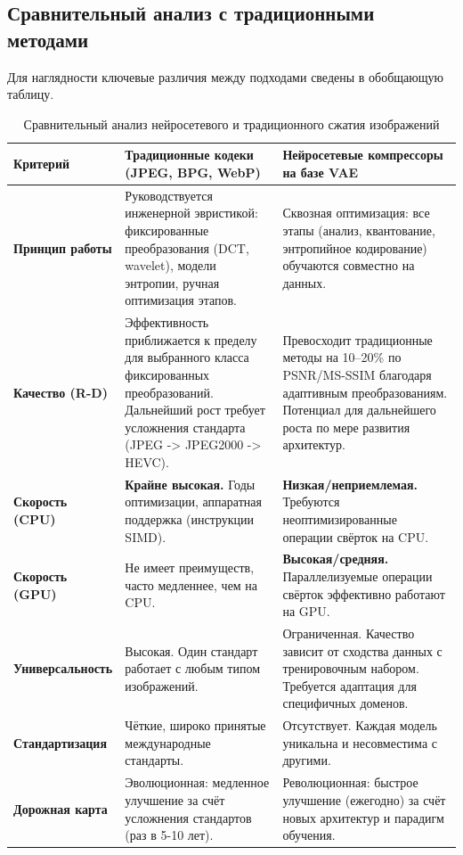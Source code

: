 \subsection{Сравнительный анализ с традиционными методами}
Для наглядности ключевые различия между подходами сведены в обобщающую таблицу.

\begin{table}[h]
\centering
\small
\caption{Сравнительный анализ нейросетевого и традиционного сжатия изображений}
\label{tab:final_comparison}
\begin{tabular}{|l|p{6cm}|p{6cm}|}
\hline
\textbf{Критерий} & \textbf{Традиционные кодеки (JPEG, BPG, WebP)} & \textbf{Нейросетевые компрессоры на базе VAE} \\
\hline
\textbf{Принцип работы} & Руководствуется инженерной эвристикой: фиксированные преобразования (DCT, wavelet), модели энтропии, ручная оптимизация этапов. & Сквозная оптимизация: все этапы (анализ, квантование, энтропийное кодирование) обучаются совместно на данных. \\
\hline
\textbf{Качество (R-D)} & Эффективность приближается к пределу для выбранного класса фиксированных преобразований. Дальнейший рост требует усложнения стандарта (JPEG -> JPEG2000 -> HEVC). & Превосходит традиционные методы на 10–20\% по PSNR/MS-SSIM благодаря адаптивным преобразованиям. Потенциал для дальнейшего роста по мере развития архитектур. \\
\hline
\textbf{Скорость (CPU)} & \textbf{Крайне высокая.} Годы оптимизации, аппаратная поддержка (инструкции SIMD). & \textbf{Низкая/неприемлемая.} Требуются неоптимизированные операции свёрток на CPU. \\
\hline
\textbf{Скорость (GPU)} & Не имеет преимуществ, часто медленнее, чем на CPU. & \textbf{Высокая/средняя.} Параллелизуемые операции свёрток эффективно работают на GPU. \\
\hline
\textbf{Универсальность} & Высокая. Один стандарт работает с любым типом изображений. & Ограниченная. Качество зависит от сходства данных с тренировочным набором. Требуется адаптация для специфичных доменов. \\
\hline
\textbf{Стандартизация} & Чёткие, широко принятые международные стандарты. & Отсутствует. Каждая модель уникальна и несовместима с другими. \\
\hline
\textbf{Дорожная карта} & Эволюционная: медленное улучшение за счёт усложнения стандартов (раз в 5-10 лет). & Революционная: быстрое улучшение (ежегодно) за счёт новых архитектур и парадигм обучения. \\
\hline
\end{tabular}
\end{table}

